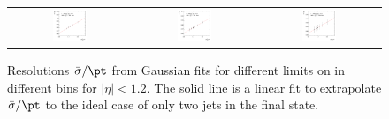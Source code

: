 \begin{figure}[ht]
\begin{tabular}{ccc}
    \includegraphics[width=0.3\textwidth]{figures/ResFit_Spring10QCDFlat_Gauss_Eta0_ExtrapolatedPar0_PtBin10} &
    \includegraphics[width=0.3\textwidth]{figures/ResFit_Spring10QCDFlat_Gauss_Eta0_ExtrapolatedPar0_PtBin11} &
    \includegraphics[width=0.3\textwidth]{figures/ResFit_Spring10QCDFlat_Gauss_Eta0_ExtrapolatedPar0_PtBin12} \\
  \end{tabular}
\caption{Resolutions $\bar{\sigma}/\pt$ from Gaussian fits for different limits on \ptrel in different \pt bins for \mbox{$|\eta|<1.2$}.
  The solid line is a linear fit to extrapolate $\bar{\sigma}/\pt$ to the ideal case of only two jets in the
  final state.}
\label{fig:ResFit:App:Gauss:Extrapolation}
\end{figure}


